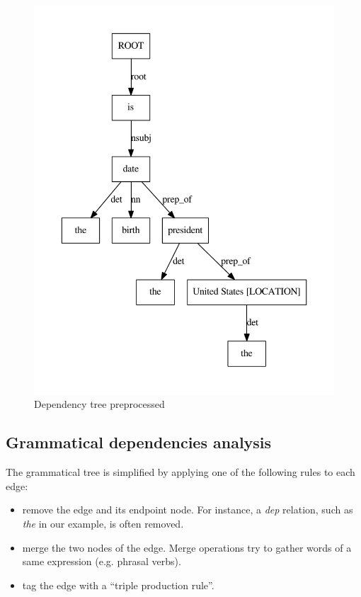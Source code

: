 \begin{figure}
  \centering
  \caption{Dependency tree preprocessed}
  \label{tree_two}
    \includegraphics[scale=0.6]{../examples_NLP_classical/tree2.pdf}
\end{figure}


\subsection{Grammatical dependencies analysis}

The grammatical tree is simplified by applying one of the following rules to each edge:
\begin{itemize}
 \item remove the edge and its endpoint node. For instance, a \textit{dep} relation, such as \textit{the} in our example, is often removed.
 \item merge the two nodes of the edge. Merge operations try to gather words of a same expression (e.g. phrasal verbs).
 \item tag the edge with a ``triple production rule''.
\end{itemize}

